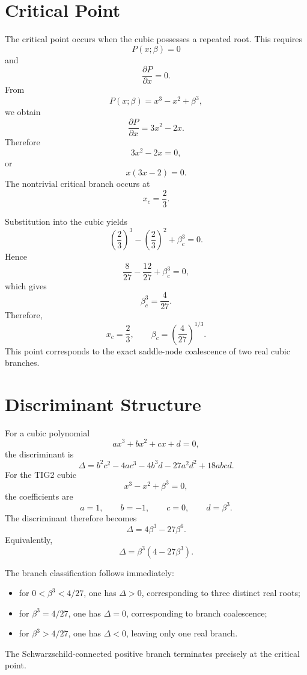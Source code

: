 \documentclass[12pt,a4paper]{article}
\begin{document}
\section{Critical Point}

The critical point occurs when the cubic possesses a repeated root. This requires
\[
P(x;\beta)=0
\]
and
\[
\frac{\partial P}{\partial x}=0.
\]
From
\[
P(x;\beta)=x^3-x^2+\beta^3,
\]
we obtain
\[
\frac{\partial P}{\partial x}=3x^2-2x.
\]
Therefore
\[
3x^2-2x=0,
\]
or
\[
x(3x-2)=0.
\]
The nontrivial critical branch occurs at
\[
x_c=\frac{2}{3}.
\]

Substitution into the cubic yields
\[
\left(\frac{2}{3}\right)^3
-
\left(\frac{2}{3}\right)^2
+
\beta_c^3
=0.
\]
Hence
\[
\frac{8}{27}
-
\frac{12}{27}
+
\beta_c^3
=0,
\]
which gives
\[
\beta_c^3=\frac{4}{27}.
\]
Therefore,
\begin{equation}
x_c=\frac{2}{3},
\qquad
\beta_c=\left(\frac{4}{27}\right)^{1/3}.
\label{eq:critical}
\end{equation}
This point corresponds to the exact saddle-node coalescence of two real cubic branches.

\section{Discriminant Structure}

For a cubic polynomial
\[
ax^3+bx^2+cx+d=0,
\]
the discriminant is
\[
\Delta
=
b^2c^2
-
4ac^3
-
4b^3d
-
27a^2d^2
+
18abcd.
\]
For the TIG2 cubic
\[
x^3-x^2+\beta^3=0,
\]
the coefficients are
\[
a=1,
\qquad
b=-1,
\qquad
c=0,
\qquad
d=\beta^3.
\]
The discriminant therefore becomes
\[
\Delta
=
4\beta^3
-
27\beta^6.
\]
Equivalently,
\begin{equation}
\Delta=\beta^3(4-27\beta^3).
\label{eq:discriminant}
\end{equation}

The branch classification follows immediately:
\begin{itemize}
\item for \(0<\beta^3<4/27\), one has \(\Delta>0\), corresponding to three distinct real roots;
\item for \(\beta^3=4/27\), one has \(\Delta=0\), corresponding to branch coalescence;
\item for \(\beta^3>4/27\), one has \(\Delta<0\), leaving only one real branch.
\end{itemize}
The Schwarzschild-connected positive branch terminates precisely at the critical point.
\end{document}
